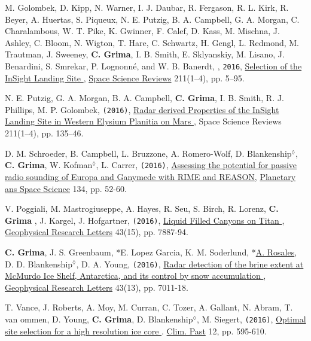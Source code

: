 \begin{etaremune}
\item
  M. Golombek, D. Kipp, N. Warner, I. J. Daubar, R. Fergason, R. L. Kirk, R. Beyer, A. Huertas, S. Piqueux, N. E. Putzig, B. A. Campbell, G. A. Morgan, C. Charalambous, W. T. Pike, K. Gwinner, F. Calef, D. Kass, M. Mischna, J. Ashley, C. Bloom, N. Wigton, T. Hare, C. Schwartz, H. Gengl, L. Redmond, M. Trautman, J. Sweeney, \textbf{C. Grima}, I. B. Smith, E. Sklyanskiy, M. Lisano, J. Benardini, S. Smrekar, P. Lognonné, and W. B. Banerdt, , \texttt{2016}, \href{http://link.springer.com/article/10.1007/s11214-016-0321-9?wt_mc=Internal.Event.1.SEM.ArticleAuthorOnlineFirst}{Selection of the InSight Landing Site \aiOpenAccessSquare}, \ul{Space Science Reviews} 211(1–4), pp. 5–95.

\item
  N. E. Putzig, G. A. Morgan, B. A. Campbell, \textbf{C. Grima}, I. B. Smith, R. J. Phillips, M. P. Golombek, \texttt{(2016)}, \href{http://link.springer.com/article/10.1007\%2Fs11214-016-0322-8}{Radar derived Properties of the InSight Landing Site in Western Elysium Planitia on Mars \aiOpenAccessSquare}, Space Science Reviews 211(1–4), pp. 135–46.
  
\item
  D. M. Schroeder, B. Campbell, L. Bruzzone, A. Romero-Wolf, D. Blankenship$^\lozenge$, \textbf{C. Grima}, W. Kofman$^\lozenge$, L. Carrer, \texttt{(2016)}, \href{http://www.sciencedirect.com/science/article/pii/S0032063316301465}{Assessing the potential for passive radio sounding of Europa and Ganymede with RIME and REASON}, \ul{Planetary ans Space Science} 134,  pp. 52-60.
  
\item
  V. Poggiali, M. Mastrogiuseppe, A. Hayes, R. Seu, S. Birch, R. Lorenz, \textbf{C. Grima }, J. Kargel, J. Hofgartner, \texttt{(2016)}, \href{http://onlinelibrary.wiley.com/doi/10.1002/2016GL069679/abstract}{Liquid Filled Canyons on Titan \aiOpenAccessSquare}, \ul{Geophysical Research Letters} 43(15), pp. 7887-94.

\item
  \textbf{C. Grima}, J. S. Greenbaum, *E. Lopez Garcia, K. M. Soderlund, *\ul{A. Rosales}, D. D. Blankenship$^\lozenge$, D. A. Young, \texttt{(2016)}, \href{http://onlinelibrary.wiley.com/doi/10.1002/2016GL069524/pdf}{Radar detection of the brine extent at McMurdo Ice Shelf, Antarctica, and its control by snow accumulation \aiOpenAccessSquare}, \ul{Geophysical Research Letters} 43(13), pp. 7011-18.

\item
  T. Vance, J. Roberts, A. Moy, M. Curran, C. Tozer, A. Gallant, N. Abram, T. van ommen, D. Young, \textbf{C. Grima}, D. Blankenship$^\lozenge$, M. Siegert, \texttt{(2016)}, \href{http://www.clim-past.net/12/595/2016/cp-12-595-2016.pdf}{Optimal site selection for a high resolution ice core \aiOpenAccessSquare}. \ul{Clim. Past} 12, pp. 595-610.


\end{etaremune}
